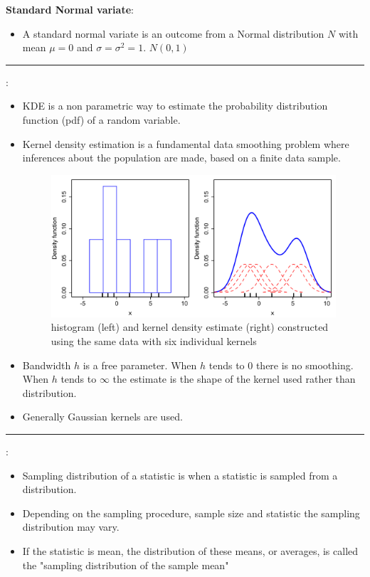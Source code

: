 \documentclass[	DIV=calc,%
paper=a4,%
fontsize=11pt,%
twocolumn]{scrartcl} %
\newcommand{\hformbar}[1]{\vspace{5pt}\hrule\vspace{10pt}} %
\newcommand{\formdesc}[1]{\noindent\textbf{#1}}
\begin{document}
\formdesc{Standard Normal variate}:
\begin{itemize}
	\item A standard normal variate is an outcome from a Normal distribution $N$ with mean $\mu=0$ and $\sigma=\sigma^2=1$.  $N(0,1)$
	
\end{itemize}

\hformbar

\formdesc{KDE (Kernel density estimation)}:
\begin{itemize}
	\item KDE is a non parametric way to estimate the probability distribution function (pdf) of a random variable.
	\item Kernel density estimation is a fundamental data smoothing problem where inferences about the population are made, based on a finite data sample.
		\begin{figure}[ht!]
		\centering
		\caption{histogram (left) and kernel density estimate (right) constructed using the same data with six individual kernels}
		\graphicspath{ {images/math/} }
		\includegraphics[width=\linewidth]{comparison_of_1d_histogram_and_kde.png}
	\end{figure}
	\item Bandwidth $h$ is a free parameter. When $h$ tends to 0 there is no smoothing. When $h$ tends to $\infty$ the estimate is the shape of the kernel used rather than distribution.
	\item Generally Gaussian kernels are used.
\end{itemize}


\hformbar

\formdesc{Sampling Distribution}:
\begin{itemize}
	\item Sampling distribution of a statistic is when a statistic is sampled from a distribution.
	\item Depending on the sampling procedure, sample size and statistic the sampling distribution may vary.
	\item If the statistic is mean, the distribution of these means, or averages, is called the "sampling distribution of the sample mean"
\end{itemize}
\end{document}
